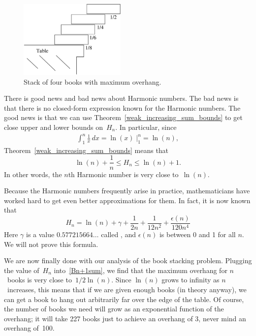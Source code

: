 \begin{figure}[htbp]
\centerline{\includegraphics[height=1.5in]{figures/drafts/optstack}}
\caption{Stack of four books with maximum overhang.}
\label{fig:optstack}
\end{figure}

There is good news and bad news about Harmonic numbers.  The bad news
is that there is no closed-form expression known for the Harmonic
numbers.  The good news is that we can use
Theorem~\ref{weak_increasing_sum_bounds} to get close upper and lower
bounds on~$H_n$.  In particular, since
\begin{align*}
\int_1^n \frac{1}{x} \, dx
    = \ln(x) \; \Bigr|_1^n %
    = \ln(n),
\end{align*}
Theorem~\ref{weak_increasing_sum_bounds} means that
\begin{equation}\label{eqn:9G30}
    \ln(n) + \frac{1}{n} \le H_n \le \ln(n) + 1.
\end{equation}
In other words, the $n$th Harmonic number is very close to~$\ln(n)$.

Because the Harmonic numbers frequently arise in practice,
mathematicians have worked hard to get even better approximations for
them.  In fact, it is now known that
\begin{equation}\label{eqn:9K2}
    H_n = \ln(n) + \gamma + \frac{1}{2n} + \frac{1}{12n^2} +
        \frac{\epsilon(n)}{120n^4}
\end{equation}
Here $\gamma$ is a value $0.577215664\dots$ called , and $\epsilon(n)$ is between 0 and 1 for all $n$.  We
will not prove this formula.

We are now finally done with our analysis of the book stacking
problem.  Plugging the value of~$H_n$ into~\eqref{Bn+1sum}, we
find that the maximum overhang for $n$~books is very close
to~$1/2\ln(n)$.  Since $\ln(n)$ grows to infinity as $n$~increases,
this means that if we are given enough books (in theory anyway), we
can get a book to hang out arbitrarily far over the edge of the
table.  Of course, the number of books we need will grow as an
exponential function of the overhang; it will take 227 books just to
achieve an overhang of 3, never mind an overhang of~100.

